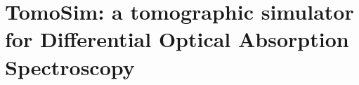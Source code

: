 \chapter{TomoSim: a tomographic simulator for Differential Optical
Absorption Spectroscopy}
\label{ap:tomosim_paper}


